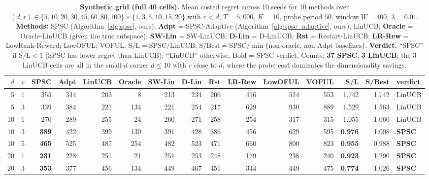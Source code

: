 \documentclass{article}
\begin{document}
 \begin{table}[!htbp]
  \centering
  \caption{\textbf{Synthetic grid (full 40 cells).} Mean costed regret
  across 10 seeds for 10 methods over
  $(d,r)\in\{5,10,20,30,45,60,80,100\}\times\{1,3,5,10,15,20\}$ with
  $r<d$, $T{=}5{,}000$, $K{=}10$, probe period $50$, window $W{=}400$,
  $\lambda{=}0.01$. \textbf{Methods:} SPSC (Algorithm~\ref{alg:spsc},
  ours); \textbf{Adpt} = SPSC-Adaptive (Algorithm~\ref{alg:spsc_adaptive},
  ours); LinUCB; \textbf{Oracle} = Oracle-LinUCB (given the true
  subspace); \textbf{SW-Lin} = SW-LinUCB; \textbf{D-Lin} = D-LinUCB;
  \textbf{Rst} = Restart-LinUCB; \textbf{LR-Rew} = LowRank-Reward;
  LowOFUL; VOFUL. $\mathrm{S/L}=\mathrm{SPSC/LinUCB}$;
  $\mathrm{S/Best}=\mathrm{SPSC}/\min\{\text{non-oracle, non-Adpt
  baselines}\}$. \textbf{Verdict.} ``SPSC'' if $\mathrm{S/L}<1$ (SPSC
  has lower regret than LinUCB); ``LinUCB'' otherwise. Bold = SPSC
  verdict. Counts: \textbf{37 SPSC}, \textbf{3 LinUCB}; the 3
  LinUCB cells are all in the small-$d$ corner $d\le 10$ with $r$
  close to $d$, where the probe cost dominates the dimensionality
  savings.}
  \label{tab:app-synthetic}
  \scriptsize
  \setlength{\tabcolsep}{2pt}
  \begin{tabular}{rr|rrrrrrrrrr|rrl}
  \toprule
  $d$ & $r$ & SPSC & Adpt & LinUCB & Oracle & SW-Lin & D-Lin & Rst & LR-Rew & LowOFUL & VOFUL & S/L & S/Best & verdict\\
  \midrule
    5 &  1 &  355 &  344 &  203 &    8 &  213 &  234 &  206 &  416 &  514 &  553 & 1.742 & 1.742 & LinUCB \\
    5 &  3 &  339 &  384 &  221 &  134 &  221 &  254 &  217 &  629 &  930 &  889 & 1.529 & 1.563 & LinUCB \\
   10 &  1 &  270 &  289 &  255 &   24 &  260 &  271 &  258 &  254 &  317 &  315 & 1.055 & 1.060 & LinUCB \\
   10 &  3 &  \textbf{389} &  422 &  399 &  130 &  391 &  428 &  386 &  456 &  629 &  595 & \textbf{0.976} & 1.008 & \textbf{SPSC} \\
   10 &  5 &  \textbf{465} &  525 &  487 &  254 &  482 &  523 &  471 &  660 &  800 &  823 & \textbf{0.955} & 0.988 & \textbf{SPSC} \\
   20 &  1 &  \textbf{231} &  228 &  251 &   21 &  251 &  253 &  248 &  179 &  238 &  240 & \textbf{0.923} & 1.290 & \textbf{SPSC} \\
   20 &  3 &  \textbf{353} &  377 &  456 &  134 &  449 &  467 &  451 &  344 &  449 &  475 & \textbf{0.774} & 1.026 & \textbf{SPSC} \\

\end{tabular}
\end{table}
\end{document}
